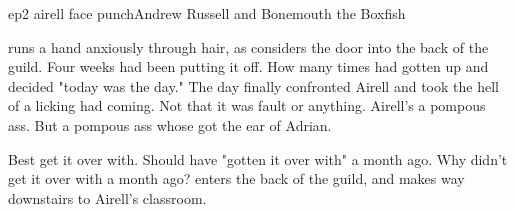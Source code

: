 \documentclass{book}
\begin{document}
\begin{childnode}{ep2 airell face punch}{Andrew Russell and Bonemouth the Boxfish}

    \name{} runs a hand anxiously through \hisher{} hair, as \heshe{} considers the door into the back of the guild. Four weeks \heshe{} had been putting it off. How many times had \heshe{} gotten
    up and decided "today was the day." The day \heshe{} finally confronted Airell and took the hell of a licking \heshe{} had coming. Not that it was \hisher{} fault or anything. Airell's a 
    pompous ass. But a pompous ass whose got the ear of Adrian.

    Best get it over with. Should have "gotten it over with" a month ago. Why didn't \heshe{} get it over with a month ago? \name{} enters the back of the guild, and makes \hisher{} way downstairs
    to Airell's classroom. 



\end{childnode}
\end{document}
